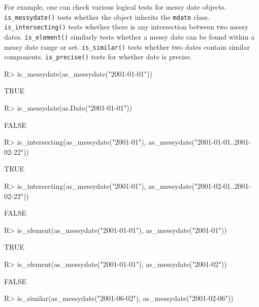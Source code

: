 \documentclass[
]{jss}
\begin{document}
For example, one can check various logical tests for messy date objects.
\texttt{is\_messydate()} tests whether the object inherits the
\texttt{mdate} class. \texttt{is\_intersecting()} tests whether there is
any intersection between two messy dates. \texttt{is\_element()}
similarly tests whether a messy date can be found within a messy date
range or set. \texttt{is\_similar()} tests whether two dates contain
similar components. \texttt{is\_precise()} tests for whether date is
precise.

\begin{CodeChunk}
\begin{CodeInput}
R> is_messydate(as_messydate("2001-01-01"))
\end{CodeInput}
\begin{CodeOutput}
[1] TRUE
\end{CodeOutput}
\begin{CodeInput}
R> is_messydate(as.Date("2001-01-01"))
\end{CodeInput}
\begin{CodeOutput}
[1] FALSE
\end{CodeOutput}
\begin{CodeInput}
R> is_intersecting(as_messydate("2001-01"), as_messydate("2001-01-01..2001-02-22"))
\end{CodeInput}
\begin{CodeOutput}
[1] TRUE
\end{CodeOutput}
\begin{CodeInput}
R> is_intersecting(as_messydate("2001-01"), as_messydate("2001-02-01..2001-02-22"))
\end{CodeInput}
\begin{CodeOutput}
[1] FALSE
\end{CodeOutput}
\begin{CodeInput}
R> is_element(as_messydate("2001-01-01"), as_messydate("2001-01"))
\end{CodeInput}
\begin{CodeOutput}
[1] TRUE
\end{CodeOutput}
\begin{CodeInput}
R> is_element(as_messydate("2001-01-01"), as_messydate("2001-02"))
\end{CodeInput}
\begin{CodeOutput}
[1] FALSE
\end{CodeOutput}
\begin{CodeInput}
R> is_similar(as_messydate("2001-06-02"), as_messydate("2001-02-06"))
\end{CodeInput}
\begin{CodeOutput}

\end{CodeOutput}
\end{CodeChunk}
\end{document}
